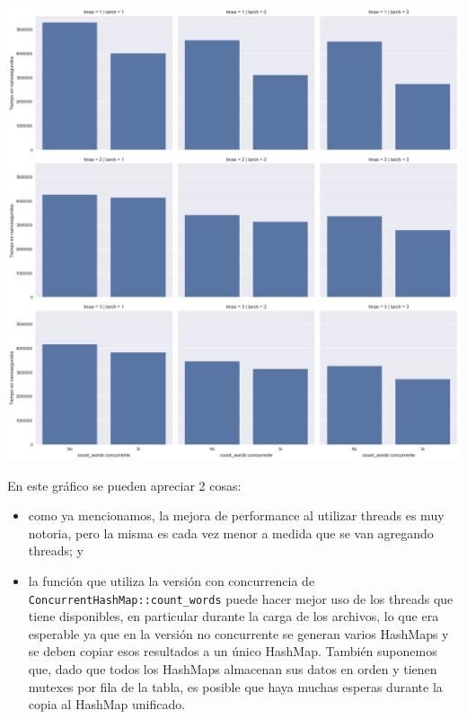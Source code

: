 \begin{center}
	\includegraphics[scale=0.45]{imgs/5-vs-6.png}
\end{center}

En este gráfico se pueden apreciar 2 cosas:

\begin{itemize}

	\item como ya mencionamos, la mejora de performance al utilizar threads es muy notoria, pero la misma es cada vez menor a medida que se van agregando threads; y

	\item la función que utiliza la versión con concurrencia de \texttt{ConcurrentHashMap::count\_words} puede hacer mejor uso de los threads que tiene disponibles, en particular durante la carga de los archivos, lo que era esperable ya que en la versión no concurrente se generan varios HashMaps y se deben copiar esos resultados a un único HashMap. También suponemos que, dado que todos los HashMaps almacenan sus datos en orden y tienen mutexes por fila de la tabla, es posible que haya muchas esperas durante la copia al HashMap unificado.

\end{itemize}